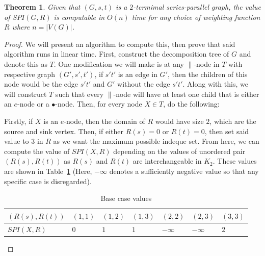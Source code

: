 \documentclass{article}
\newtheorem{thm}{Theorem}[section]
\begin{document}
\begin{thm}\label{thm:sp-alg}
    Given that $(G, s,t)$ is a $2$-termimal series-parallel graph, the value of $SPI(G, R)$ is computable in $O(n)$ time for any choice of weighting function $R$ where $n = |V(G)|$.
\end{thm}
\begin{proof}
We will present an algorithm to compute this, then prove that said algorithm runs in linear time. First, construct the decomposition tree of $G$ and denote this as $T$. One modification we will make is at any $\parallel$-node in $T$ with respective graph $(G', s',t')$, if $s't'$ is an edge in $G'$, then the children of this node would be the edge $s't'$ and $G'$ without the edge $s't'$. Along with this, we will construct $T$ such that every $\parallel$-node will have at least one child that is either an $e$-node or a $\bullet$-node. Then, for every node $X \in T$, do the following:

Firstly, if $X$ is an $e$-node, then the domain of $R$ would have size $2$, which are the source and sink vertex. Then, if either $R(s) = 0$ or $R(t) = 0$, then set said value to $3$ in $R$ as we want the maximum possible indeque set. From here, we can compute the value of $SPI(X, R)$ depending on the values of unordered pair $(R(s), R(t))$ as $R(s)$ and $R(t)$ are interchangeable in $K_2$. These values are shown in Table~\ref{tab1} (Here, $-\infty$ denotes a sufficiently negative value so that any specific case is disregarded).
\begin{table}[!htb]
\begin{center}
\begin{tabular}{|l|l|l|l|l|l|l|}
\hline
$(R(s), R(t))$ & $(1,1)$ & $(1,2)$ & $(1, 3)$ & $(2,2)$ & $(2,3)$ & $(3,3)$ \\ \hline
$SPI(X, R)$    &   $0$   &   $1$   &   $1$    &$-\infty$&$-\infty$&   $2$   \\ \hline
\end{tabular}
\end{center}
\caption{Base case values}\label{tab1}
\end{table}


\end{proof}
\end{document}
